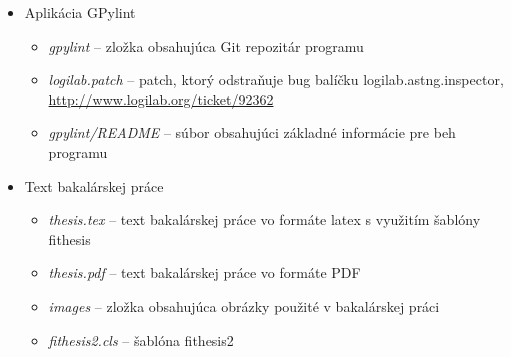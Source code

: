 \documentclass[11pt,oneside,final]{fithesis2}
\begin{document}
\begin{itemize}
\item Aplikácia GPylint

	\begin{itemize}
	 \item \emph{gpylint} -- zložka obsahujúca Git repozitár programu
	 \item \emph{logilab.patch} -- patch, ktorý odstraňuje bug balíčku logilab.astng.inspector, \url{http://www.logilab.org/ticket/92362}
	 \item \emph{gpylint/README} -- súbor obsahujúci základné informácie pre beh programu
	\end{itemize}



\item Text bakalárskej práce

	\begin{itemize}
	 \item \emph{thesis.tex} -- text bakalárskej práce vo formáte latex s využitím šablóny fithesis
	 \item \emph{thesis.pdf} -- text bakalárskej práce vo formáte PDF
	 \item \emph{images} -- zložka obsahujúca obrázky použité v bakalárskej práci
	 \item \emph{fithesis2.cls} -- šablóna fithesis2
	\end{itemize}
	
\end{itemize}
\end{document}
